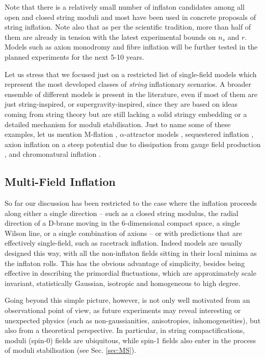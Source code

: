 Note that there is a relatively small number of inflaton candidates among all open and closed string moduli and most have been used in concrete proposals of string inflation. Note also that as per the scientific tradition, more than half of them are already in tension with the latest experimental bounds on $n_s$ and $r$. Models such as axion monodromy and fibre inflation will be further tested in the planned experiments for the next 5-10 years.

Let us stress that we focused just on a restricted list of single-field models which represent the most developed classes of {\it string} inflationary scenarios. A  broader ensemble of different models is present in the literature, even if most of them are just string-inspired, or supergravity-inspired, since they are based on ideas coming from string theory but are still lacking a solid stringy embedding or a detailed mechanism for moduli stabilisation. Just to name some of these examples, let us mention M-flation \cite{Ashoorioon:2009wa,Ashoorioon:2009sr,Ashoorioon:2011ki,Ashoorioon:2014jja}, $\alpha$-attractor models \cite{Kallosh:2013yoa,Kallosh:2013maa,Galante:2014ifa,Kallosh:2015lwa, Bhattacharya:2022akq}, sequestered inflation \cite{Kallosh:2021fvz,Kallosh:2021vcf}, axion inflation on a steep potential due to dissipation from gauge field production \cite{Anber:2009ua,Anber:2012du}, and chromonatural inflation \cite{Adshead:2012kp}. 



\subsection{Multi-Field Inflation}
 
So far our discussion has been restricted to the case where the inflation proceeds along either a single direction -- such as  a closed string modulus, the radial direction of a D-brane moving in the 6-dimensional compact space, a single Wilson line, or a single combination of axions -- or with predictions that are effectively single-field, such as racetrack inflation. Indeed models are usually designed this way,  with all the non-inflaton fields sitting in their local minima as the inflaton rolls. This has the obvious advantage of simplicity, besides being effective in describing the primordial fluctuations, which are approximately scale invariant, statistically Gaussian, isotropic and homogeneous to high degree. 

Going beyond this simple picture, however, is not only well  motivated from an observational point of view, as future experiments may reveal interesting or unexpected physics (such as non-gaussianities, anisotropies, inhomogeneities), but also from a theoretical perspective. In particular, in string compactifications, moduli (spin-0) fields are ubiquitous, while spin-1 fields also enter in the process of moduli stabilisation (see Sec. \ref{sec:MS}). 

